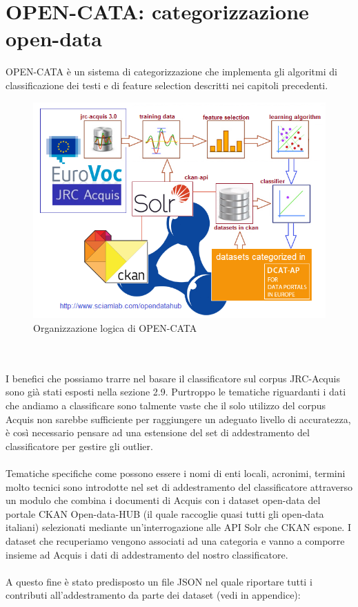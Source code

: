 \documentclass{article}
\theoremstyle{plain}
\theoremstyle{definition}
\begin{document}
\section{OPEN-CATA: categorizzazione open-data}
OPEN-CATA è un sistema di categorizzazione che implementa gli algoritmi di classificazione dei testi e di feature selection descritti nei capitoli precedenti.
\begin{figure}[htbp]
\begin{center}
\includegraphics[scale=1.00]{img/abstract.png}
\caption{Organizzazione logica di OPEN-CATA}
\end{center}
\end{figure}
\phantom
\\
\\
I benefici che possiamo trarre nel basare il classificatore sul corpus JRC-Acquis sono già stati esposti nella sezione 2.9. Purtroppo le tematiche riguardanti i dati che andiamo a classificare sono talmente vaste che il solo utilizzo del corpus Acquis non sarebbe sufficiente per raggiungere un adeguato livello di accuratezza, è così necessario pensare ad una estensione del set di addestramento del classificatore per gestire gli outlier.
\\
\\
Tematiche specifiche come possono essere i nomi di enti locali, acronimi, termini molto tecnici sono introdotte nel set di addestramento del classificatore attraverso un modulo che combina i documenti di Acquis con i dataset open-data del portale CKAN Open-data-HUB (il quale raccoglie quasi tutti gli open-data italiani) selezionati mediante un'interrogazione alle API Solr che CKAN espone. I dataset che recuperiamo vengono associati ad una categoria e vanno a comporre insieme ad Acquis i dati di addestramento del nostro classificatore.
\\
\\
A questo fine è stato predisposto un file JSON nel quale riportare tutti i contributi all'addestramento da parte dei dataset (vedi  in appendice):
\end{document}
